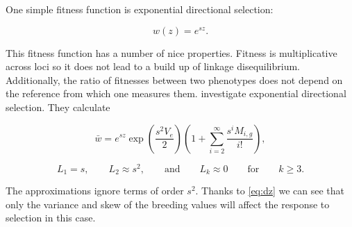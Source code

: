 One simple fitness function is exponential directional selection:

\begin{equation}
  w(z) = e^{sz}.
\end{equation}

This fitness function has a number of nice properties. Fitness is multiplicative
across loci so it does not lead to a build up of linkage disequilibrium.
Additionally, the ratio of fitnesses between two phenotypes does not depend on
the reference from which one measures them. \citet{Turelli1990} investigate
exponential directional selection. They calculate

\begin{equation}
  \bar{w} = e^{sz} \exp \left( \frac{s^2V_e}{2} \right)
  \left( 1 + \sum_{i=2}^{\infty} \frac{s^iM_{i,g}}{i!} \right),
\end{equation}

\begin{equation}
  L_1 = s, \qquad L_2\approx s^2, \qquad \text{and} \qquad L_k \approx 0 \qquad \text{for} \qquad k \geq 3.
\end{equation}

The approximations ignore terms of order $s^2$. Thanks to \eqref{eq:dz} we can
see that only the variance and skew of the breeding values will affect the response to selection in this case. 

